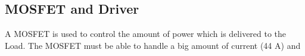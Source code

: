 \subsection{MOSFET and Driver}
A MOSFET is used to control the amount of power which is delivered to the Load. The MOSFET must be able to handle a big amount of current (44 A) and 